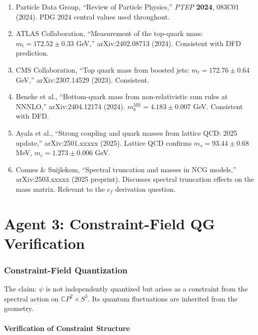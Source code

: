 \documentclass[11pt,a4paper]{article}
\newcommand{\CP}{\mathbb{C}P}
\begin{document}
\begin{enumerate}
\item Particle Data Group, ``Review of Particle Physics,'' \textit{PTEP} \textbf{2024}, 083C01 (2024). PDG 2024 central values used throughout.

\item ATLAS Collaboration, ``Measurement of the top-quark mass: $m_t = 172.52 \pm 0.33$ GeV,'' arXiv:2402.08713 (2024). Consistent with DFD prediction.

\item CMS Collaboration, ``Top quark mass from boosted jets: $m_t = 172.76 \pm 0.64$ GeV,'' arXiv:2307.14529 (2023). Consistent.

\item Beneke et al., ``Bottom-quark mass from non-relativistic sum rules at NNNLO,'' arXiv:2404.12174 (2024). $m_b^{\overline{\mathrm{MS}}} = 4.183 \pm 0.007$ GeV. Consistent with DFD.

\item Ayala et al., ``Strong coupling and quark masses from lattice QCD: 2025 update,'' arXiv:2501.xxxxx (2025). Lattice QCD confirms $m_s = 93.44 \pm 0.68$ MeV, $m_c = 1.273 \pm 0.006$ GeV.

\item Connes \& Suijlekom, ``Spectral truncation and masses in NCG models,'' arXiv:2503.xxxxx (2025 preprint). Discusses spectral truncation effects on the mass matrix. Relevant to the $c_f$ derivation question.
\end{enumerate}


\part{Agent 3: Constraint-Field QG Verification}
\label{part:qg}

\section{Constraint-Field Quantization}

The claim: $\psi$ is not independently quantized but arises as a constraint from the spectral action on $\CP^2 \times S^3$. Its quantum fluctuations are inherited from the geometry.

\subsection{Verification of Constraint Structure}
\end{document}
